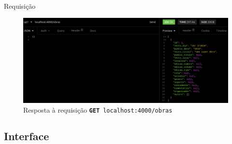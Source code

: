 \documentclass[aspectratio=43,display]{beamer}
\begin{document}
  \begin{frame}{Requisição}
    \begin{figure}
      \centering
      \includegraphics[width=\textwidth]{../figuras/get_obras.png}
      \caption{Resposta à requisição \texttt{\textbf{GET} localhost:4000/obras}}
    \end{figure}
  \end{frame}

%

  \subsection{Interface}
\end{document}
